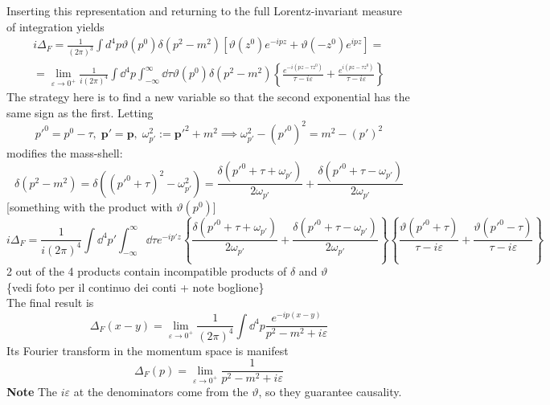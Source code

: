 Inserting this representation and returning to the full Lorentz-invariant
measure of integration yields
\begin{gather*}
i\Delta_F = \frac{1}{(2\pi)^3}\int d^4p\vartheta(p^0)\delta(p^2-m^2)\left[
\vartheta(z^0) e^{-ipz} + \vartheta(-z^0)e^{ipz}\right]=\\
=\lim\limits_{\varepsilon\to0^+}
\frac{1}{i(2\pi)^4}\int \dd^4p\int_{-\infty}^\infty \dd\tau \vartheta(p^0)
\delta(p^2-m^2)\left\{\frac{e^{-i(pz-\tau z^0)}}{\tau-i\varepsilon}
+ \frac{e^{i(pz-\tau z^0)}}{\tau-i\varepsilon}\right\}
\end{gather*}
The strategy here is to find a new variable so that the second exponential
has the same sign as the first.
Letting
$$p'^0 = p^0-\tau,\;\mathbf{p'=p},\;\omega_{p'}^2:=\mathbf{p'}^2+m^2\implies
\omega_{p'}^2-(p'^0)^2 = m^2 - (p')^2$$
modifies the mass-shell:
$$\delta(p^2-m^2)=\delta((p'^0+\tau)^2-\omega_{p'}^2) = \frac{\delta(p'^0+\tau+
\omega_{p'})}{2\omega_{p'}} + \frac{\delta(p'^0+\tau-\omega_{p'})}{2\omega_{p'}}$$
[something with the product with $\vartheta(p^0)$]
$$i\Delta_F = \frac{1}{i(2\pi)^4}\int \dd^4p'\int_{-\infty}^\infty \dd\tau
e^{-ip'z}\left\{\frac{\delta(p'^0+\tau+\omega_{p'})}{2\omega_{p'}} +
\frac{\delta(p'^0+\tau-\omega_{p'})}{2\omega_{p'}}\right\}\left\{
\frac{\vartheta(p'^0+\tau)}{\tau-i\varepsilon}+\frac{\vartheta(p'^0-\tau)}
{\tau-i\varepsilon}\right\}
$$
2 out of the 4 products contain incompatible products of $\delta$ and $\vartheta$\\
\{vedi foto per il continuo dei conti + note boglione\}
\\
The final result is
$$\boxed{\Delta_F(x-y) = \lim\limits_{\varepsilon\to0^+}\frac{1}{(2\pi)^4}
\int \dd^4p \frac{e^{-ip(x-y)}}{p^2-m^2+i\varepsilon}}$$
Its Fourier transform in the momentum space is manifest
$$\Delta_F(p) = \lim\limits_{\varepsilon\to0^+}\frac{1}{p^2-m^2+i\varepsilon}$$
\textbf{Note} The $i\varepsilon$ at the denominators come from the $\vartheta$, so
they guarantee causality.
